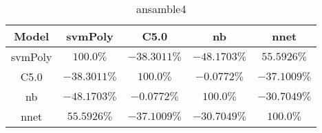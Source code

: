 \begin{table}[!ht]
	\centering
	\begin{tabular}{|c|c|c|c|c|}
		\hline
		Model & svmPoly & C5.0 & nb & nnet \\ \hline
		svmPoly & $100.0\%$ & $-38.3011\%$ & $-48.1703\%$ & $55.5926\%$ \\ \hline
		C5.0 & $-38.3011\%$ & $100.0\%$ & $-0.0772\%$ & $-37.1009\%$ \\ \hline
		nb & $-48.1703\%$ & $-0.0772\%$ & $100.0\%$ & $-30.7049\%$ \\ \hline
		nnet & $55.5926\%$ & $-37.1009\%$ & $-30.7049\%$ & $100.0\%$ \\ \hline
	\end{tabular}
	\caption{ansamble4}
	\label{tab:ansamble4}
\end{table}

